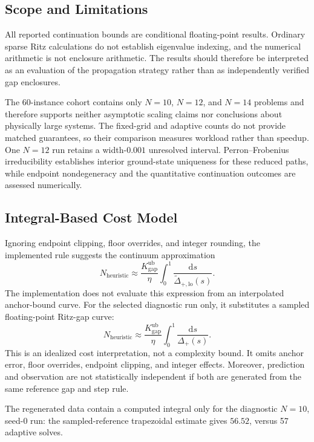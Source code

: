 \documentclass[11pt, a4paper]{article}
\newcommand{\dd}{\mathrm{d}}
\begin{document}
\subsection{Scope and Limitations}
All reported continuation bounds are conditional floating-point results. Ordinary sparse Ritz calculations do not establish eigenvalue indexing, and the numerical arithmetic is not enclosure arithmetic. The results should therefore be interpreted as an evaluation of the propagation strategy rather than as independently verified gap enclosures.

The 60-instance cohort contains only $N=10$, $N=12$, and $N=14$ problems and therefore supports neither asymptotic scaling claims nor conclusions about physically large systems. The fixed-grid and adaptive counts do not provide matched guarantees, so their comparison measures workload rather than speedup. One $N=12$ run retains a width-$0.001$ unresolved interval. Perron--Frobenius irreducibility establishes interior ground-state uniqueness for these reduced paths, while endpoint nondegeneracy and the quantitative continuation outcomes are assessed numerically.

\subsection{Integral-Based Cost Model}
Ignoring endpoint clipping, floor overrides, and integer rounding, the implemented rule suggests the continuum approximation
\begin{equation}
\label{eq:integral_cost}
N_{\mathrm{heuristic}}\approx\frac{K_{\mathrm{gap}}^{\mathrm{ub}}}{\eta}
\int_0^1\frac{\dd s}{\widetilde\Delta_{+,\mathrm{lo}}(s)}.
\end{equation}
The implementation does not evaluate this expression from an interpolated anchor-bound curve. For the selected diagnostic run only, it substitutes a sampled floating-point Ritz-gap curve:
\begin{equation}
N_{\mathrm{heuristic}}\approx\frac{K_{\mathrm{gap}}^{\mathrm{ub}}}{\eta}
\int_0^1\frac{\dd s}{\Delta_+(s)}.
\end{equation}
This is an idealized cost interpretation, not a complexity bound. It omits anchor error, floor overrides, endpoint clipping, and integer effects. Moreover, prediction and observation are not statistically independent if both are generated from the same reference gap and step rule.

The regenerated data contain a computed integral only for the diagnostic $N=10$, seed-0 run: the sampled-reference trapezoidal estimate gives $56.52$, versus 57 adaptive solves.
\end{document}
